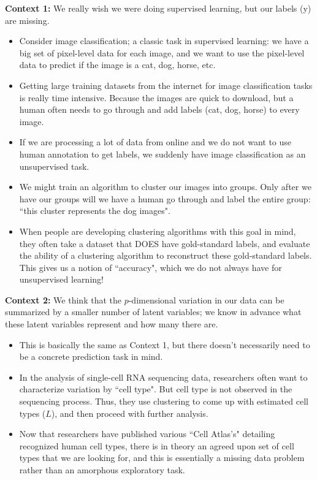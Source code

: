 \begin{list}{}{}
\item[\textbf{Context 1:}] We really wish we were doing supervised learning, but our labels (y) are missing.
\begin{itemize} 
\item  Consider image classification; a classic task in supervised learning: we have a big set of pixel-level data for each image, and we want to use the pixel-level data to predict if the image is a cat, dog, horse, etc.
\item Getting large training datasets from the internet for image classification tasks is really time intensive. Because the images are quick to download, but a human often needs to go through and add labels (cat, dog, horse) to every image.
\item If we are processing a lot of data from online and we do not want to use human annotation to get labels, we suddenly have image classification as an unsupervised task.
\item We might train an algorithm to cluster our images into groups. Only after we have our groups will we have a human go through and label the entire group: ``this cluster represents the dog images". 
\item When people are developing clustering algorithms with this goal in mind, they often take a dataset that DOES have gold-standard labels, and evaluate the ability of a clustering algorithm to reconstruct these gold-standard labels. This gives us a notion of ``accuracy", which we do not always have for unsupervised learning!
\end{itemize}
\item[\textbf{Context 2:}] We think that the $p$-dimensional variation in our data can be summarized by a smaller number of latent variables; we know in advance what these latent variables represent and how many there are. 
\begin{itemize}
\item This is basically the same as Context 1, but there doesn't necessarily need to be a concrete prediction task in mind.
\item In the analysis of single-cell RNA sequencing data, researchers often want to characterize variation by ``cell type". But cell type is not observed in the sequencing process. Thus, they use clustering to come up with estimated cell types ($L$), and then proceed with further analysis.
\item Now that researchers have published various ``Cell Atlas's" detailing recognized human cell types, there is in theory an agreed upon set of cell types that we are looking for, and this is essentially a missing data problem rather than an amorphous exploratory task. 

\end{itemize}
\end{list}
